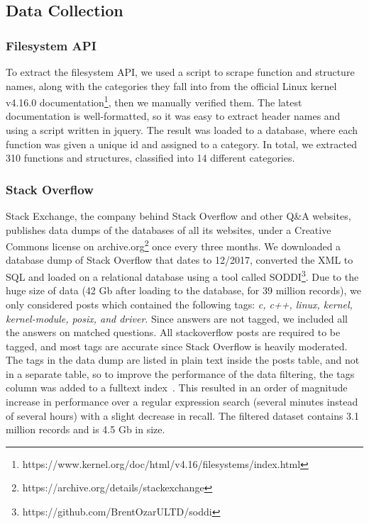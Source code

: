 \subsection{Data Collection}\label{subsec:data}
\subsubsection{Filesystem API}
To extract the filesystem API, we used a script to scrape function and structure names, along with the categories they fall into from the official Linux kernel v4.16.0 documentation\footnote{https://www.kernel.org/doc/html/v4.16/filesystems/index.html}, then we manually verified them. The latest documentation is well-formatted, so it was easy to extract header names and using a script written in jquery. The result was loaded to a database, where each function was given a unique id and assigned to a category. In total, we extracted 310 functions and structures, classified into 14 different categories.

\subsubsection{Stack Overflow}
Stack Exchange, the company behind Stack Overflow and other Q\&A websites, publishes data dumps of the databases of all its websites, under a Creative Commons license on archive.org\footnote{https://archive.org/details/stackexchange} once every three months. We downloaded a database dump of Stack Overflow that dates to 12/2017, converted the XML to SQL and loaded on a relational database using a tool called SODDI\footnote{https://github.com/BrentOzarULTD/soddi}. Due to the huge size of data (42 Gb after loading to the database, for 39 million records), we only considered posts which contained the following tags: \textit{c, c++, linux, kernel, kernel-module, posix, and driver}. Since answers are not tagged, we included all the answers on matched questions. All stackoverflow posts are required to be tagged, and most tags are accurate since Stack Overflow is heavily moderated. The tags in the data dump are listed in plain text inside the posts table, and not in a separate table, so to improve the performance of the data filtering, the tags column was added to a fulltext index~\cite{Hamilton2001}. This resulted in an order of magnitude increase in performance over a regular expression search (several minutes instead of several hours) with a slight decrease in recall. The filtered dataset contains 3.1 million records and is 4.5 Gb in size.

